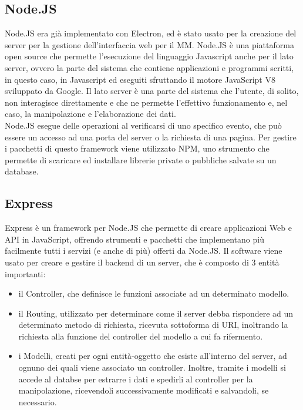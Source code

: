 \subsection{Node.JS}
Node.JS era già implementato con Electron, ed è stato usato per la creazione del server
per la gestione dell'interfaccia web per il MM.
Node.JS \`e una piattaforma open source che permette l'esecuzione del linguaggio Javascript
anche per il lato server, ovvero
la parte del sistema che contiene applicazioni e programmi  scritti, in questo caso, in Javascript
ed eseguiti sfruttando il motore JavaScript V8 sviluppato da Google.
Il lato server è una parte del sistema che l'utente, di solito, non interagisce direttamente
e che ne permette l'effettivo funzionamento e, nel caso, la manipolazione e l'elaborazione
dei dati.\\
Node.JS esegue delle operazioni al verificarsi di uno specifico evento, che pu\`o essere un accesso ad una porta
del server o la richiesta di una pagina.
Per gestire i pacchetti di questo framework viene utilizzato NPM\cite{NPM}, uno strumento che permette
di scaricare ed installare librerie private o pubbliche salvate su un database.
\\[1\baselineskip]

\subsection{Express}\label{cap:express}
Express \`e un framework per Node.JS che permette di creare applicazioni Web e API in JavaScript, offrendo strumenti e pacchetti
che implementano più facilmente tutti i servizi (e anche di più) offerti da Node.JS.
Il software viene usato per creare e gestire il backend di un server, che \`e composto di 3 entit\`a importanti:
\begin{itemize}
\item il Controller, che definisce le funzioni associate ad un determinato modello.
\item il Routing, utilizzato per determinare come il server debba rispondere ad un determinato metodo di richiesta,
ricevuta sottoforma di URI, inoltrando la richiesta alla funzione del controller del modello a cui fa rifermento.
\item i Modelli, creati per ogni entit\`a-oggetto che esiste all'interno del server, ad ognuno dei quali viene associato
un controller. Inoltre, tramite i modelli si accede al databse per estrarre i dati e spedirli al controller per
la manipolazione, ricevendoli successivamente modificati e salvandoli, se necessario.
\\[2\baselineskip]
\end{itemize}

